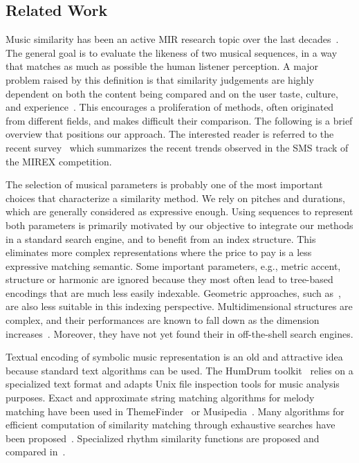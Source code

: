 \documentclass[letterpaper, 11pt]{article}
\begin{document}
\subsection{Related Work}
Music similarity has been an active MIR research topic over the last decades~\cite{Casey2008}. The general
goal is to evaluate the likeness of two musical sequences, in a way that matches as much
as possible the human listener perception. A major problem raised by this definition
is that similarity judgements are highly dependent on both the content being compared and
on the user taste, culture, and experience~\cite{JDE07,ERP17}. This encourages 
a proliferation of methods, often originated from different fields, and 
makes difficult their comparison. The following is a brief overview that positions
our approach. The interested reader is referred to the recent survey~\cite{Velardo2016}
which summarizes the recent trends observed in the SMS track of the MIREX competition.

The selection of musical parameters
is probably one of the most important choices that characterize a similarity method. We rely
on pitches and durations, which are generally considered as expressive enough. 
Using sequences to represent both parameters is primarily motivated by 
our objective to integrate our methods in a standard search engine, and to 
benefit from an index structure. This eliminates more complex representations where the price
to pay is a less expressive matching semantic. Some important parameters,
e.g., metric accent, structure or harmonic 
are ignored because they most often lead to tree-based encodings that are much less easily indexable. Geometric approaches,
such as~\cite{TGVWO03},
are also less suitable in this indexing perspective. Multidimensional structures are complex, 
and their  performances are known to
fall down as the dimension increases~\cite{Samet2006}. Moreover, 
they have not yet found their in off-the-shell search engines.

Textual encoding of symbolic music representation is an old and attractive idea
because standard text algorithms can be used. The HumDrum toolkit~\cite{Knopke08}
relies on a specialized text format and adapts Unix file inspection tools for music analysis
purposes. 
Exact and approximate
string matching algorithms for melody matching have been used in ThemeFinder~\cite{Kornstaedt98} or Musipedia~\cite{PLT01}.
Many algorithms for efficient
computation of similarity matching through exhaustive searches
have been proposed~\cite{CCF04,CCF05,CI04,CCIMS05}. 
Specialized rhythm similarity functions are proposed and compared in~\cite{Toussaint04}.
\end{document}
